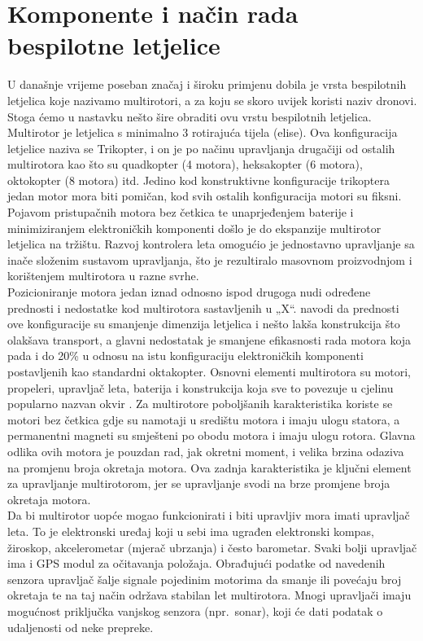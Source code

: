 \documentclass[times, utf8, diplomski]{fer}
\begin{document}
\section{Komponente i način rada bespilotne letjelice}
U današnje vrijeme poseban značaj i široku primjenu dobila je vrsta bespilotnih letjelica koje nazivamo multirotori,  a za koju  se skoro uvijek koristi naziv  dronovi.  Stoga ćemo  u nastavku nešto šire obraditi ovu vrstu bespilotnih letjelica.\\
Multirotor je letjelica s minimalno 3 rotirajuća tijela (elise). Ova konfiguracija letjelice naziva se Trikopter, i on je po načinu upravljanja drugačiji od ostalih multirotora kao što su quadkopter   (4   motora),   heksakopter   (6   motora),   oktokopter   (8   motora)   itd.   Jedino   kod konstruktivne konfiguracije  trikoptera  jedan  motor  mora  biti pomičan,  kod  svih  ostalih konfiguracija  motori  su  fiksni.  Pojavom pristupačnih motora bez četkica   te unaprjeđenjem baterije  i minimiziranjem elektroničkih  komponenti  došlo  je  do  ekspanzije multirotor letjelica na tržištu. Razvoj kontrolera leta omogućio je jednostavno upravljanje sa inače složenim sustavom upravljanja, što je rezultiralo masovnom proizvodnjom i korištenjem multirotora u razne svrhe.\\
Pozicioniranje  motora  jedan  iznad  odnosno ispod drugoga nudi određene prednosti i nedostatke  kod  multirotora  sastavljenih  u  „X“.  \citet{Zilic}  navodi  da  prednosti  ove konfiguracije su smanjenje dimenzija letjelica i nešto lakša konstrukcija što olakšava transport, a glavni nedostatak je smanjene efikasnosti rada motora koja pada i do 20\% u odnosu na istu konfiguraciju  elektroničkih  komponenti  postavljenih  kao  standardni  oktakopter.  Osnovni elementi  multirotora  su  motori,  propeleri, upravljač leta,  baterija  i  konstrukcija  koja  sve  to povezuje   u   cjelinu   popularno   nazvan   okvir   .  Za  multirotore  poboljšanih karakteristika koriste se motori bez četkica gdje su namotaji u središtu motora i imaju ulogu statora, a permanentni magneti su smješteni po obodu motora i imaju ulogu rotora. Glavna odlika ovih motora je pouzdan rad, jak okretni moment, i velika brzina odaziva na promjenu broja okretaja motora. Ova zadnja karakteristika je ključni element za upravljanje multirotorom, jer se upravljanje svodi na brze promjene broja okretaja motora.\\
Da bi multirotor uopće mogao funkcionirati i biti upravljiv mora imati upravljač leta. To je elektronski uređaj koji u sebi ima ugrađen elektronski kompas, žiroskop, akcelerometar (mjerač ubrzanja) i često barometar. Svaki bolji upravljač ima i GPS  modul za očitavanja položaja. Obrađujući podatke od navedenih senzora upravljač šalje signale pojedinim motorima da smanje ili povećaju broj okretaja te na taj način održava stabilan let  multirotora.  Mnogi upravljači imaju mogućnost priključka vanjskog senzora  (npr.~sonar), koji će dati podatak o udaljenosti od neke prepreke. \citep{Zilic}\\
\end{document}
